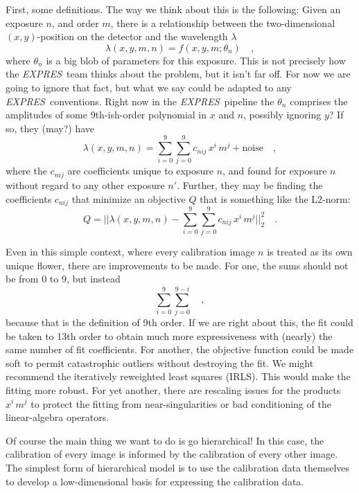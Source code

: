 \documentclass[12pt, letterpaper]{article}
\newcommand{\project}[1]{\textsl{#1}}
\newcommand{\acronym}[1]{{\small{#1}}}
\newcommand{\expres}{\project{\acronym{EXPRES}}}
\begin{document}
First, some definitions.
The way we think about this is the following:
Given an exposure $n$, and order $m$, there is a relationship between
the two-dimensional $(x,y)$-position on the detector and the
wavelength $\lambda$
\begin{equation}
\lambda(x,y,m,n) = f(x,y,m;\theta_{n})
\quad ,
\end{equation}
where $\theta_{n}$ is a big blob of parameters for this exposure.
This is not precisely how the \expres\ team thinks about the problem,
but it isn't far off.
For now we are going to ignore that fact, but what we say
could be adapted to any \expres\ conventions.
Right now in the \expres\ pipeline the $\theta_{n}$ comprises the
amplitudes of some 9th-ish-order polynomial in $x$ and $n$, possibly
ignoring $y$?
If so, they (may?) have
\begin{equation}
\lambda(x,y,m,n) = \sum_{i=0}^9\sum_{j=0}^9 c_{nij}\, x^i\,m^j + \mathrm{noise}
\quad ,
\end{equation}
where the $c_{nij}$ are coefficients unique to exposure $n$, and
found for exposure $n$ without regard to any other exposure $n'$.
Further, they may be finding the coefficients $c_{nij}$ that
minimize an objective $Q$ that is something like the L2-norm:
\begin{equation}
Q = ||\lambda(x,y,m,n) - \sum_{i=0}^9\sum_{j=0}^9 c_{nij}\, x^i\,m^j||_2^2
\quad .
\end{equation}

Even in this simple context, where every calibration image $n$ is
treated as its own unique flower, there are improvements to be
made.
For one, the sums should not be from 0 to 9, but instead
\begin{equation}
\sum_{i=0}^9\sum_{j=0}^{9-i}
\quad ,
\end{equation}
because that is the definition of 9th order.
If we are right about this, the fit could be taken to 13th order to obtain
much more expressiveness with (nearly) the same number of fit coefficients.
For another, the objective function could be made soft to permit
catastrophic outliers without destroying the fit.
We might recommend the iteratively reweighted least squares (IRLS).
This would make the fitting more robust.
For yet another, there are rescaling issues for the products $x^i\,m^j$ to
protect the fitting from near-singularities or bad conditioning of the
linear-algebra operators.

Of course the main thing we want to do is go hierarchical!
In this case, the calibration of every image is informed by the
calibration of every other image.
The simplest form of hierarchical model is to use the calibration data
themselves to develop a low-dimensional basis for expressing the
calibration data.
\end{document}
